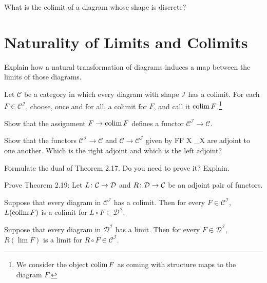 \bs
\es

\bx
What is the colimit of a diagram whose shape is discrete?
\ex

\bs
\es

\section{Naturality of Limits and Colimits}

\bp
Explain how a natural transformation of diagrams induces a map between the limits of those diagrams.
\ep

\bs
\es

\bp
Let $\mathcal{C}$ be a category in which every diagram with shape $\mathcal{I}$ has a colimit. For each $F \in \mathcal{C}^{\mathcal{I}}$, choose, once and for all, a colimit for $F$, and call it $\operatorname{colim} F$.\footnote{We consider the object $\operatorname{colim} F$ as coming with structure maps to the diagram $F$.}
\ben[label=(\alph*)]
\item Show that the assignment $F\to \operatorname{colim} F$ defines a functor $\mathcal{C}^{\mathcal{I}} \to \mathcal{C}$.
\item Show that the functors $\mathcal{C}^{\mathcal{I}} \to \mathcal{C}$ and $\mathcal{C} \to \mathcal{C}^{\mathcal{I}}$ given by \bse
F\longmapsto \colim F \qquad {} \qquad X \longmapsto \Delta_X
\ese
are adjoint to one another. Which is the right adjoint and which is the left adjoint?
\een
\ep

\bs
\ben[label=(\alph*)]
\item 
\item 
\een
\es

\addtocounter{exercise}{1}

\bx
Formulate the dual of Theorem 2.17. Do you need to prove it? Explain.
\ex

\bs
\es

\addtocounter{exercise}{1}
\bp
Prove Theorem 2.19: Let $L \colon \mathcal{C} \to \mathcal{D}$ and $R \colon \mathcal{D} \to \mathcal{C}$ be an adjoint pair of functors.
\ben[label=(\alph*)]
\item Suppose that every diagram in $\mathcal{C}^{\mathcal{I}}$ has a colimit. Then for every $F \in \mathcal{C}^{\mathcal{I}}$, $L(\operatorname{colim} F)$ is a colimit for $L \circ F \in \mathcal{D}^{\mathcal{I}}$.
\item Suppose that every diagram in $\mathcal{D}^{\mathcal{I}}$ has a limit. Then for every $F \in \mathcal{D}^{\mathcal{I}}$, $R(\lim F)$ is a limit for $R \circ F \in \mathcal{C}^{\mathcal{I}}$.
\een
\ep

